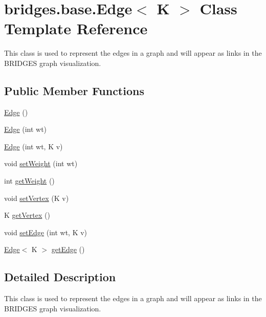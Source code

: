 \hypertarget{classbridges_1_1base_1_1_edge}{}\section{bridges.\+base.\+Edge$<$ K $>$ Class Template Reference}
\label{classbridges_1_1base_1_1_edge}


This class is used to represent the edges in a graph and will appear as links in the B\+R\+I\+D\+G\+ES graph visualization.  


\subsection*{Public Member Functions}
\begin{DoxyCompactItemize}
\item 
\hyperlink{classbridges_1_1base_1_1_edge_a2535dd24e430ae90d2837db13824f8f2}{Edge} ()
\item 
\hyperlink{classbridges_1_1base_1_1_edge_a82c37eae608b774535c4bc79079cfeec}{Edge} (int wt)
\item 
\hyperlink{classbridges_1_1base_1_1_edge_afe54a7f07ad28ef551720f365e07b610}{Edge} (int wt, K v)
\item 
void \hyperlink{classbridges_1_1base_1_1_edge_a25eadea2591fb65c9fb681cc297ac7a8}{set\+Weight} (int wt)
\item 
int \hyperlink{classbridges_1_1base_1_1_edge_a2b6a382a0a4a4c2c55a40c5954c7845d}{get\+Weight} ()
\item 
void \hyperlink{classbridges_1_1base_1_1_edge_aad504e0c684d897986abf96cbea0d54b}{set\+Vertex} (K v)
\item 
K \hyperlink{classbridges_1_1base_1_1_edge_a3108d7f80c0b033b1be1185daf715836}{get\+Vertex} ()
\item 
void \hyperlink{classbridges_1_1base_1_1_edge_ae7764323dbfbaba26ed79be07ab0762d}{set\+Edge} (int wt, K v)
\item 
\hyperlink{classbridges_1_1base_1_1_edge}{Edge}$<$ K $>$ \hyperlink{classbridges_1_1base_1_1_edge_a342c3a936fd39d8ea9b345707b4b2237}{get\+Edge} ()
\end{DoxyCompactItemize}


\subsection{Detailed Description}
This class is used to represent the edges in a graph and will appear as links in the B\+R\+I\+D\+G\+ES graph visualization. 


